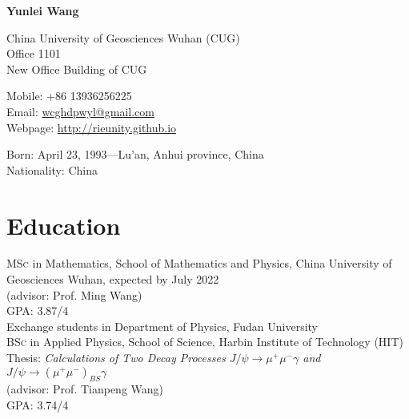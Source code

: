 \documentclass[11pt]{article} %
\begin{document}

{\LARGE\bfseries Yunlei Wang} %
\bigskip\bigskip\medskip %

China University of Geosciences Wuhan (CUG)\\ %
Office 1101\\ New Office Building of CUG

\vspace{0.01\textheight} 

Mobile: +86 13936256225\\ %
Email: \href{wcghdpwyl@gmail.com}{wcghdpwyl@gmail.com}\\ %
Webpage: \href{http://rieunity.github.io}{http://rieunity.github.io}%

\vspace{0.01\textheight} %


Born: April 23, 1993---Lu'an, Anhui province, China\\ %
Nationality: China %


\section*{Education}

\textsc{MSc} in Mathematics, School of Mathematics and Physics, China University of Geosciences Wuhan, expected by July 2022\\
(advisor: Prof. Ming Wang)\\
GPA: 3.87/4 \\
 Exchange students in Department of Physics,  Fudan University\\
\textsc{BSc} in Applied Physics, School of Science, Harbin Institute of Technology (HIT)\\
Thesis: \emph{Calculations of Two Decay Processes $J /\psi \to \mu^+\mu^-\gamma$ and $J /\psi \to (\mu^+\mu^-)_{BS}\gamma$} \\
(advisor: Prof. Tianpeng Wang) \\
GPA: 3.74/4 
\end{document}
